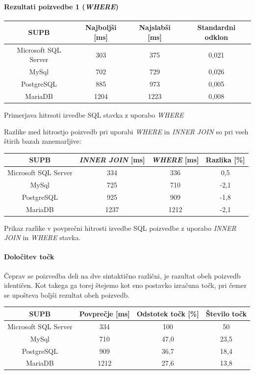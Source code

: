 \documentclass[a4paper,11pt]{report}
\begin{document}
\paragraph{Rezultati poizvedbe 1 (\textit{WHERE})}
\begin{center}
   \begin{tabular}{||c|c|c|c||}
      \hline
      \textbf{SUPB} & \textbf{Najboljši [ms]} & \textbf{Najslabši [ms]} & \textbf{Standardni odklon}\\
      \hline
      \hline
      Microsoft SQL Server & 303 & 375 & 0,021 \\
      MySql & 702 & 729 & 0,026 \\
      PostgreSQL & 885 & 973 & 0,005\\
      MariaDB & 1204 & 1223 & 0,008 \\
      \hline
   \end{tabular}
\end{center}
Primerjava hitrsoti izvedbe SQL stavka z uporabo \textit{WHERE}

\pagebreak
Razlike med hitrostjo poizvedb pri uporabi \textit{WHERE} in \textit{INNER JOIN} so pri vseh štirih bazah zanemarljive:

\begin{center}
   \begin{tabular}{||c|c|c|c||}
      \hline
      \textbf{SUPB} & \textbf{\textit{INNER JOIN} [ms]} & \textbf{\textit{WHERE} [ms]} & \textbf{Razlika [\%]}\\
      \hline
      \hline
      Microsoft SQL Server & 334 & 336 & 0,5 \\
      MySql & 725 & 710 & -2,1 \\
      PostgreSQL & 925 & 909 & -1,8\\
      MariaDB & 1237 & 1212 & -2,1 \\
      \hline
   \end{tabular}
\end{center}
Prikaz razlike v povprečni hitrosti izvedbe SQL poizvedbe z uporabo \textit{INNER JOIN} in \textit{WHERE} stavka.

\paragraph{Določitev točk} Čeprav se poizvedba deli na dve sintaktično različni, je razultat obeh poizvedb identičen. Kot takega
ga torej štejemo kot eno postavko izračuna točk, pri čemer se upošteva boljši rezultat obeh poizvedb.

\begin{center}
   \begin{tabular}{||c|c|c|c||}
      \hline
      \textbf{SUPB} & \textbf{Povprečje [ms]} & \textbf{Odstotek točk [\%]} & \textbf{Število točk}\\
      \hline
      \hline
      Microsoft SQL Server & 334 & 100 & 50 \\
      MySql & 710 & 47,0 & 23,5 \\
      PostgreSQL & 909 & 36,7 & 18,4\\
      MariaDB & 1212 & 27,6 & 13,8 \\
      \hline
   \end{tabular}
\end{center}
\end{document}
